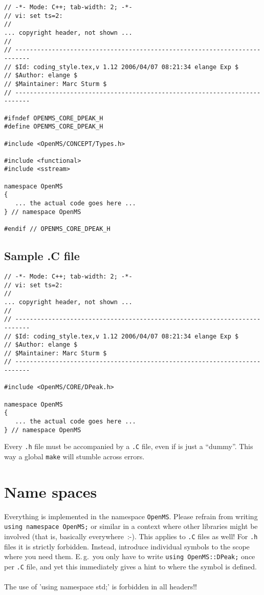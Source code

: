 \documentclass[a4]{article}
\begin{document}
\begin{footnotesize}
\begin{verbatim}
// -*- Mode: C++; tab-width: 2; -*-
// vi: set ts=2:
//
... copyright header, not shown ...
//
// --------------------------------------------------------------------------
// $Id: coding_style.tex,v 1.12 2006/04/07 08:21:34 elange Exp $
// $Author: elange $
// $Maintainer: Marc Sturm $
// --------------------------------------------------------------------------

#ifndef OPENMS_CORE_DPEAK_H
#define OPENMS_CORE_DPEAK_H

#include <OpenMS/CONCEPT/Types.h>

#include <functional>
#include <sstream>

namespace OpenMS
{
   ... the actual code goes here ...
} // namespace OpenMS

#endif // OPENMS_CORE_DPEAK_H
\end{verbatim}
\end{footnotesize}

\subsection{Sample .C file}

\begin{footnotesize}
\begin{verbatim}
// -*- Mode: C++; tab-width: 2; -*-
// vi: set ts=2:
//
... copyright header, not shown ...
//
// --------------------------------------------------------------------------
// $Id: coding_style.tex,v 1.12 2006/04/07 08:21:34 elange Exp $
// $Author: elange $
// $Maintainer: Marc Sturm $
// --------------------------------------------------------------------------

#include <OpenMS/CORE/DPeak.h>

namespace OpenMS
{
   ... the actual code goes here ...
} // namespace OpenMS

\end{verbatim}
\end{footnotesize}
Every \texttt{.h} file must be accompanied by a \texttt{.C} file, even if is
just a ``dummy''.  This way a global \texttt{make} will
stumble across errors.


\section{Name spaces}

Everything is implemented in the namespace \texttt{OpenMS}.  Please refrain
from writing \texttt{using namespace OpenMS;} or similar in a context where
other libraries might be involved (that is, basically everywhere~:-).  This
applies to \texttt{.C} files as well!  For \texttt{.h} files it is strictly
forbidden.  Instead, introduce individual symbols to the scope where you need
them.  E.\,g.\ you only have to write \texttt{using OpenMS::DPeak;} once per
\texttt{.C} file, and yet this immediately gives a hint to where the symbol is
defined.\\
\\
The use of 'using namespace std;' is forbidden in all headers!!
\end{document}
